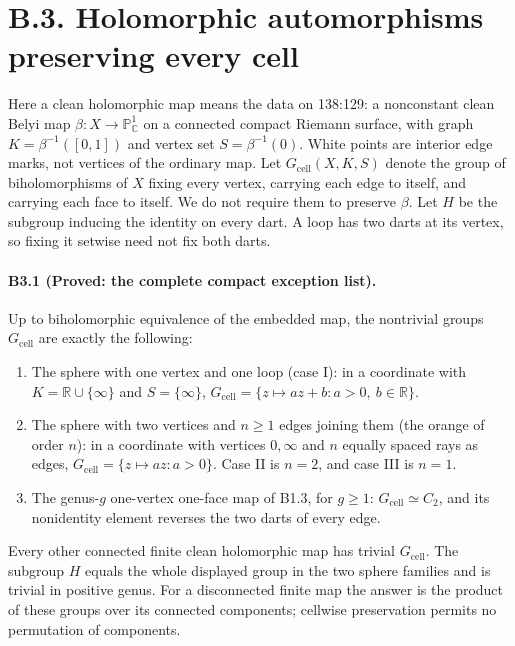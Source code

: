 \section{B.3. Holomorphic automorphisms preserving every cell}

Here a clean holomorphic map means the data on 138:129:
a nonconstant clean Belyi map
$\beta:X\longrightarrow\mathbb P^1_{\mathbb C}$ on a connected compact
Riemann surface, with graph $K=\beta^{-1}([0,1])$ and vertex set
$S=\beta^{-1}(0)$. White points are interior edge marks, not vertices
of the ordinary map. Let $G_{\mathrm{cell}}(X,K,S)$ denote the group of
biholomorphisms of $X$ fixing every vertex, carrying each edge to
itself, and carrying each face to itself. We do not require them to
preserve $\beta$. Let $H$ be the subgroup inducing the identity on
every dart. A loop has two darts at its vertex, so fixing it setwise
need not fix both darts.

\paragraph{B3.1 (Proved: the complete compact exception list).}
Up to biholomorphic equivalence of the embedded map, the nontrivial
groups $G_{\mathrm{cell}}$ are exactly the following:
\begin{enumerate}
\item The sphere with one vertex and one loop (case I): in a coordinate
with $K=\mathbb R\cup\{\infty\}$ and $S=\{\infty\}$,
$G_{\mathrm{cell}}=\{z\mapsto az+b:a>0,\ b\in\mathbb R\}$.
\item The sphere with two vertices and $n\geq1$ edges joining them
(the orange of order $n$): in a coordinate with vertices $0,\infty$
and $n$ equally spaced rays as edges,
$G_{\mathrm{cell}}=\{z\mapsto az:a>0\}$.
Case II is $n=2$, and case III is $n=1$.
\item The genus-$g$ one-vertex one-face map of B1.3, for $g\geq1$:
$G_{\mathrm{cell}}\simeq C_2$, and its nonidentity element reverses
the two darts of every edge.
\end{enumerate}
Every other connected finite clean holomorphic map has trivial
$G_{\mathrm{cell}}$. The subgroup $H$ equals the whole displayed
group in the two sphere families and is trivial in positive genus.
For a disconnected finite map the answer is the product of these
groups over its connected components; cellwise preservation permits
no permutation of components.

